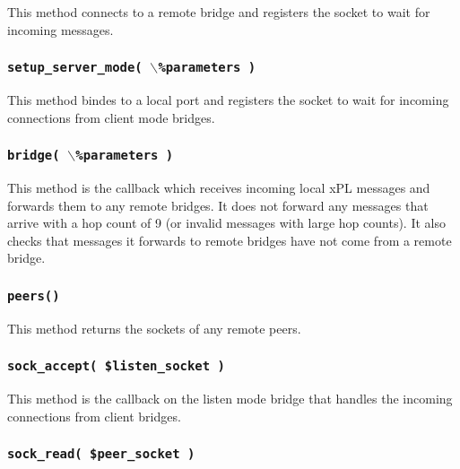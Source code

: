 This method connects to a remote bridge and registers the socket to
wait for incoming messages.

\subsubsection*{\texttt{setup\_server\_mode( $\backslash$\%parameters )}\label{xPL::Bridge_setup_server_mode_backslash_parameters_}}


This method bindes to a local port and registers the socket to wait
for incoming connections from client mode bridges.

\subsubsection*{\texttt{bridge( $\backslash$\%parameters )}\label{xPL::Bridge_bridge_backslash_parameters_}}


This method is the callback which receives incoming local xPL messages
and forwards them to any remote bridges.  It does not forward any
messages that arrive with a hop count of 9 (or invalid messages with
large hop counts).  It also checks that messages it forwards to remote
bridges have not come from a remote bridge.

\subsubsection*{\texttt{peers()}\label{xPL::Bridge_peers_}}


This method returns the sockets of any remote peers.

\subsubsection*{\texttt{sock\_accept( \$listen\_socket )}\label{xPL::Bridge_sock_accept_listen_socket_}}


This method is the callback on the listen mode bridge that handles the
incoming connections from client bridges.

\subsubsection*{\texttt{sock\_read( \$peer\_socket )}\label{xPL::Bridge_sock_read_peer_socket_}}


